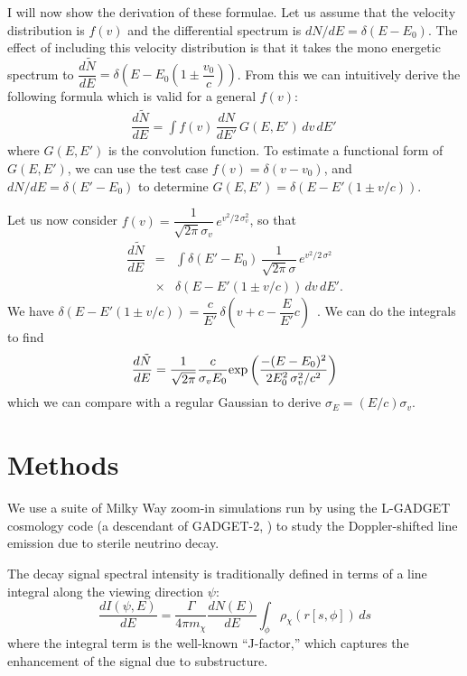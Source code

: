 \documentclass[aps,prl,10pt,twocolumn,superscriptaddress,showpacs]{revtex4-1}
\begin{document}
I will now show the derivation of these formulae.  Let us assume that the velocity distribution is $f(v)$ and the differential spectrum is $dN/dE = \delta (E- E_0)$.  The effect of including this velocity distribution is that it takes the mono energetic spectrum to $\dfrac{d\tilde{N}}{dE} = \delta \left(E - E_0 (1 \pm \dfrac{v_0}{c})\right)$.  From this we can intuitively derive the following formula which is valid for a general $f(v)$:
\begin{eqnarray}
\dfrac{d\tilde{N}}{dE} = \int f(v) \, \dfrac{dN}{dE'} \, G(E, E') \, dv \, dE' \,
\label{eq:step 1}
\end{eqnarray}
where $G(E, E')$ is the convolution function.  To estimate a functional form of $G(E, E')$, we can use the test case $f(v) = \delta (v - v_0)$, and $dN/dE = \delta (E' - E_0)$ to determine $G(E, E') = \delta (E - E' (1 \pm v/c))$.

Let us now consider $f(v) = \dfrac{1}{\sqrt{2\pi} \sigma_v} \, e^{v^2/2 \, \sigma_v^2}$, so that
\begin{eqnarray}
\dfrac{d\tilde{N}}{dE} &=& \int \delta(E' - E_0) \, \dfrac{1}{\sqrt{2\pi} \sigma} \, e^{v^2/2 \, \sigma^2} \, \nonumber\\
&\times& \delta (E - E' (1 \pm v/c)) \, dv \, dE'.
\label{eq:step2}
\end{eqnarray}
We have $\delta (E - E' (1 \pm v/c)) = \dfrac{c}{E'} \, \delta \left(v + c - \dfrac{E}{E'} c \right)$\, .  We can do the integrals to find
\begin{eqnarray}
\dfrac{d\tilde{N}}{dE} =  \dfrac{1}{\sqrt{2\pi}} \dfrac{c}{\sigma_v E_0} {\rm exp} \left( \dfrac{-(E-E_0)^2}{2 E_0^2 \, \sigma_v^2/c^2} \right)
\label{eq:step3}
\end{eqnarray}
which we can compare with a regular Gaussian to derive $\sigma_E = (E/c) \sigma_v$.


\section{Methods}

We use a suite of Milky Way zoom-in simulations run by \cite{mao2015} using the L-GADGET cosmology code
(a descendant of GADGET-2, \cite{springel2005}) to study the Doppler-shifted line emission due to sterile neutrino decay. 

The decay signal spectral intensity is traditionally defined in terms of a line integral along the viewing direction $\psi$:
\begin{equation}
\frac{dI(\psi, E)}{dE} = \frac{\Gamma}{4 \pi m_\chi} \frac{dN(E)}{dE} \int_\phi \rho_\chi(r[s,\phi]) \, ds
\end{equation}
where the integral term is the well-known ``J-factor,'' which captures the enhancement of the 
signal due to substructure.
\end{document}
